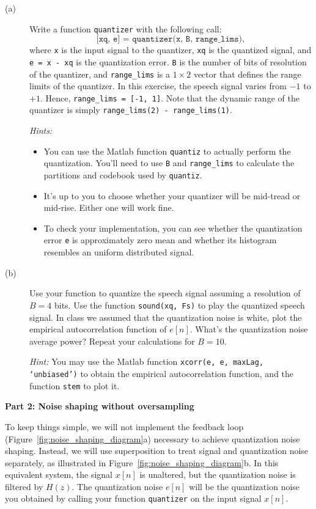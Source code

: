 \documentclass[12pt]{report}
\begin{document}
\begin{description}
	\item[(a)]  Write a function \texttt{quantizer} with the following call: 
	\begin{equation*}
	\texttt{[xq, e] = quantizer(x, B, range\_lims)},
	\end{equation*}
	where \texttt{x} is the input signal to the quantizer, \texttt{xq} is the quantized signal, and \texttt{e = x - xq} is the quantization error. \texttt{B} is the number of bits of resolution of the quantizer, and  \texttt{range\_lims} is a $1\times 2$ vector that defines the range limits of the quantizer. In this exercise, the speech signal varies from $-1$ to $+1$. Hence,  \texttt{range\_lims = [-1, 1]}. Note that the dynamic range of the quantizer is simply  \texttt{range\_lims(2) -  range\_lims(1)}.
		
	\textit{Hints:}
	\begin{itemize}
		\item You can use the Matlab function \texttt{quantiz} to actually perform the quantization. You'll need to use \texttt{B} and \texttt{range\_lims} to calculate the partitions and codebook used by \texttt{quantiz}.
		\item It's up to you to choose whether your quantizer will be mid-tread or mid-rise. Either one will work fine.
		\item To check your implementation, you can see whether the quantization error \texttt{e} is approximately zero mean and whether its histogram resembles an uniform distributed signal.		
	\end{itemize}
	
	\item[(b)] Use your function to quantize the speech signal assuming a resolution of $B = 4$ bits. Use the function \texttt{sound(xq, Fs)} to play the quantized speech signal. In class we assumed that the quantization noise is white, plot the empirical autocorrelation function of $e[n]$. What's the quantization noise average power? Repeat your calculations for $B = 10$.
	
	\textit{Hint:} You may use the Matlab function \texttt{xcorr(e, e, maxLag, `unbiased')} to obtain the empirical autocorrelation function, and the function \texttt{stem} to plot it.
\end{description}
	
\noindent\textbf{Part 2: Noise shaping without oversampling}
	
To keep things simple, we will not implement the feedback loop (Figure~\ref{fig:noise_shaping_diagram}a) necessary to achieve quantization noise shaping. Instead, we will use superposition to treat signal and quantization noise separately, as illustrated in Figure~\ref{fig:noise_shaping_diagram}b. In this equivalent system, the signal $x[n]$ is unaltered, but the quantization noise is filtered by $H(z)$. The quantization noise $e[n]$ will be the quantization noise you obtained by calling your function \texttt{quantizer} on the input signal $x[n]$.
	
\end{document}

